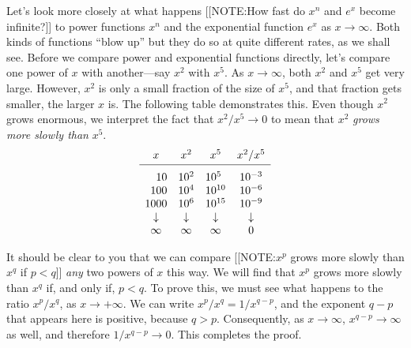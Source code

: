 	Let's look more closely at what happens 
	[[NOTE:How fast do $x^n$ and $e^x$ become infinite?]]
to power functions $x^n$ and the exponential function $e^x$ as $x \to \infty$.  Both kinds of functions ``blow up'' but they do so at quite different rates, as we shall see.  Before we compare power and exponential functions directly, let's compare one power of $x$ with another---say $x^2$ with $x^5$.  As $x \to \infty$, both $x^2$ and $x^5$ get very large.  However, $x^2$ is only a small fraction of the size of $x^5$, and that fraction gets smaller, the larger $x$ is.  The following table  demonstrates this.  Even though $x^2$ grows enormous, we interpret the fact that $x^2/x^5 \to 0$ to mean that $x^2$ {\em grows more slowly than\/} $x^5$. 
	\addtolength{\arraycolsep}{14pt}
	\[
\begin{array}{cccc}
	x & x^2 & x^5 & x^2/x^5 \\[2pt] \hline
	\rule{0pt}{14pt} \hphantom{00}10 \rule{0pt}{14pt} &
		10^2 & 10^{5\hphantom{0}} & 10^{-3} \\
	\hphantom{0}100 & 10^4 & 10^{10} & 10^{-6} \\
	1000 & 10^6 & 10^{15} & 10^{-9} \\
	\downarrow & \downarrow & \downarrow & \downarrow \\
	\infty & \infty & \infty & 0 
	\end{array}
\]
	\addtolength{\arraycolsep}{-14pt}

It should be clear to you that we can compare 
[[NOTE:$x^p$ grows more slowly than $x^q$ if $p < q$]]
{\em any\/} two powers of $x$ this way.  We will find that $x^p$ grows
more slowly than $x^q$ if, and only if, $p < q$.  To prove this, we
must see what happens to the ratio $x^p/x^q$, as $x \to +\infty$.  We
can write $x^p/x^q = 1/x^{q - p}$, and the exponent $q - p$ that
appears here is positive, because $q > p$.  Consequently, as $x \to
\infty$, $x^{q-p} \to \infty$ as well, and therefore $1/x^{q-p} \to
0$.  This completes the proof.




